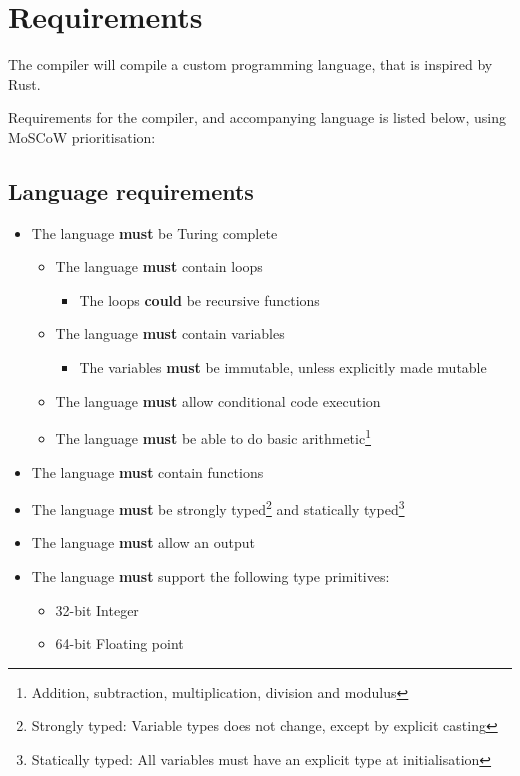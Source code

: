 \newpage
\section{Requirements}
The compiler will compile a custom programming language, that is inspired by Rust.

Requirements for the compiler, and accompanying language is listed below, using MoSCoW prioritisation:

\subsection{Language requirements} %

\begin{itemize}
\item The language \textbf{must} be Turing complete
\begin{itemize}
\item The language \textbf{must} contain loops
\begin{itemize}
\item The loops \textbf{could} be recursive functions
\end{itemize}
\item The language \textbf{must} contain variables
\begin{itemize}
\item The variables \textbf{must} be immutable, unless explicitly made mutable
\end{itemize}
\item The language \textbf{must} allow conditional code execution
\item The language \textbf{must} be able to do basic arithmetic\footnote{Addition, subtraction, multiplication, division and modulus}
\end{itemize}
\item The language \textbf{must} contain functions
\item The language \textbf{must} be strongly typed\footnote{Strongly typed: Variable types does not change, except by explicit casting} and statically typed\footnote{Statically typed: All variables must have an explicit type at initialisation}
\item The language \textbf{must} allow an output
\item The language \textbf{must} support the following type primitives:
\begin{itemize}
\item 32-bit Integer
\item 64-bit Floating point

\end{itemize}
\end{itemize}
